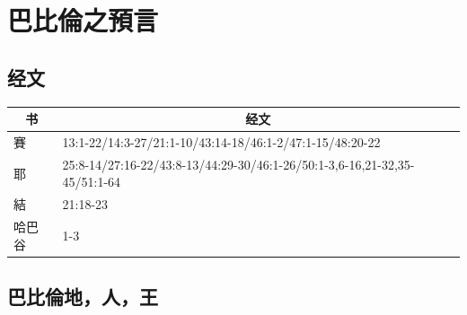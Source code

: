 
\section{巴比倫之預言}
\subsection{经文}
\begin{table}[H]
\centering
\begin{tabular}{p{1.25cm}|p{12.250cm}}\hline\hline
\multicolumn{1}{c|}{书}&\multicolumn{1}{c}{经文}\\\hline
賽&13:1-22/14:3-27/21:1-10/43:14-18/46:1-2/47:1-15/48:20-22\\\hline
耶&25:8-14/27:16-22/43:8-13/44:29-30/46:1-26/50:1-3,6-16,21-32,35-45/51:1-64\\\hline
結&21:18-23\\\hline
哈巴谷&1-3\\\hline
\end{tabular}
\end{table}

\subsection{巴比倫地，人，王}
